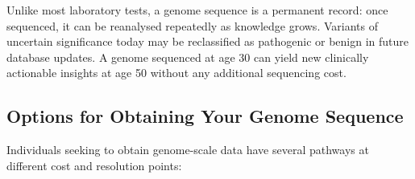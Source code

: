 \begin{keyconcept}[title={Why Your Genome Is Worth Sequencing Once}]
Unlike most laboratory tests, a genome sequence is a permanent record: once sequenced, it can be reanalysed repeatedly as knowledge grows. Variants of uncertain significance today may be reclassified as pathogenic or benign in future database updates. A genome sequenced at age 30 can yield new clinically actionable insights at age 50 without any additional sequencing cost.
\end{keyconcept}

\subsection{Options for Obtaining Your Genome Sequence}
\label{subsec:demo:options}

Individuals seeking to obtain genome-scale data have several pathways at different cost and resolution points:

